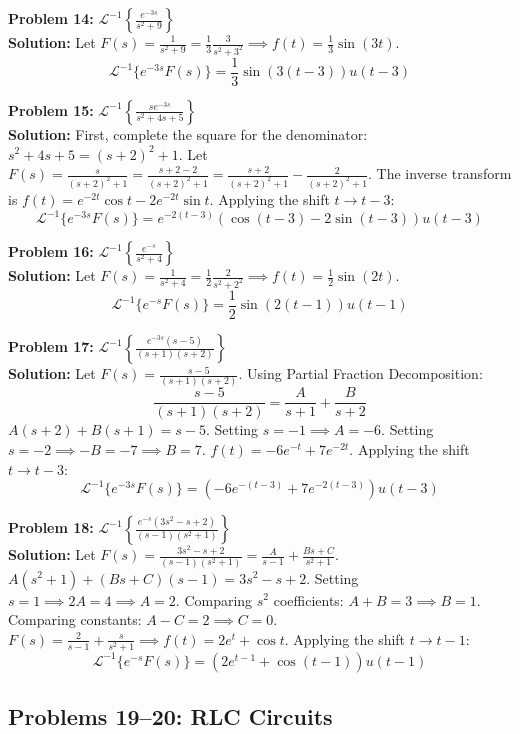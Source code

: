 \documentclass[11pt, letterpaper]{article}
\theoremstyle{definition}
\theoremstyle{remark}
\newcommand{\Lap}{\mathcal{L}}
\begin{document}
\textbf{Problem 14:} $\Lap^{-1}\left\{ \frac{e^{-3s}}{s^2+9} \right\}$
\\[4pt]
\textbf{Solution:}
Let $F(s) = \frac{1}{s^2+9} = \frac{1}{3} \frac{3}{s^2+3^2} \implies f(t) = \frac{1}{3}\sin(3t)$.
\[
\Lap^{-1}\{e^{-3s}F(s)\} = \frac{1}{3}\sin(3(t-3))u(t-3)
\]

\textbf{Problem 15:} $\Lap^{-1}\left\{ \frac{s e^{-3s}}{s^2+4s+5} \right\}$
\\[4pt]
\textbf{Solution:}
First, complete the square for the denominator: $s^2+4s+5 = (s+2)^2+1$.
Let $F(s) = \frac{s}{(s+2)^2+1} = \frac{s+2-2}{(s+2)^2+1} = \frac{s+2}{(s+2)^2+1} - \frac{2}{(s+2)^2+1}$.
The inverse transform is $f(t) = e^{-2t}\cos t - 2e^{-2t}\sin t$.
Applying the shift $t \to t-3$:
\[
\Lap^{-1}\{e^{-3s}F(s)\} = e^{-2(t-3)}(\cos(t-3) - 2\sin(t-3))u(t-3)
\]

\textbf{Problem 16:} $\Lap^{-1}\left\{ \frac{e^{-s}}{s^2+4} \right\}$
\\[4pt]
\textbf{Solution:}
Let $F(s) = \frac{1}{s^2+4} = \frac{1}{2} \frac{2}{s^2+2^2} \implies f(t) = \frac{1}{2}\sin(2t)$.
\[
\Lap^{-1}\{e^{-s}F(s)\} = \frac{1}{2}\sin(2(t-1))u(t-1)
\]

\textbf{Problem 17:} $\Lap^{-1}\left\{ \frac{e^{-3s}(s-5)}{(s+1)(s+2)} \right\}$
\\[4pt]
\textbf{Solution:}
Let $F(s) = \frac{s-5}{(s+1)(s+2)}$. Using Partial Fraction Decomposition:
\[
\frac{s-5}{(s+1)(s+2)} = \frac{A}{s+1} + \frac{B}{s+2}
\]
$A(s+2) + B(s+1) = s-5$. Setting $s=-1 \implies A = -6$. Setting $s=-2 \implies -B = -7 \implies B = 7$.
$f(t) = -6e^{-t} + 7e^{-2t}$.
Applying the shift $t \to t-3$:
\[
\Lap^{-1}\{e^{-3s}F(s)\} = \left( -6e^{-(t-3)} + 7e^{-2(t-3)} \right)u(t-3)
\]

\textbf{Problem 18:} $\Lap^{-1}\left\{ \frac{e^{-s}(3s^2-s+2)}{(s-1)(s^2+1)} \right\}$
\\[4pt]
\textbf{Solution:}
Let $F(s) = \frac{3s^2-s+2}{(s-1)(s^2+1)} = \frac{A}{s-1} + \frac{Bs+C}{s^2+1}$.
$A(s^2+1) + (Bs+C)(s-1) = 3s^2-s+2$.
Setting $s=1 \implies 2A = 4 \implies A=2$.
Comparing $s^2$ coefficients: $A+B = 3 \implies B=1$.
Comparing constants: $A-C = 2 \implies C=0$.
$F(s) = \frac{2}{s-1} + \frac{s}{s^2+1} \implies f(t) = 2e^t + \cos t$.
Applying the shift $t \to t-1$:
\[
\Lap^{-1}\{e^{-s}F(s)\} = (2e^{t-1} + \cos(t-1))u(t-1)
\]

\subsection{Problems 19–20: RLC Circuits}
\end{document}
